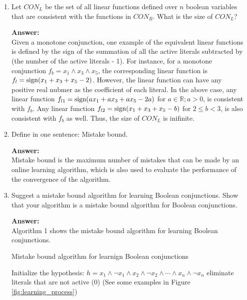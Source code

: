 \begin{enumerate}
{\bf Answer:}\\
For every variable, there are two cases, active or not active. Thus, the size of $CON_B$ is $2^n$. 

\item Let $CON_L$ be the set of all linear functions defined over $n$ boolean variables that are consistent with the functions in $CON_B$. What is the size of $CON_L$?

{\bf Answer:}\\
Given a monotone conjunction, one example of the equivalent linear functions is defined by the sign of the summation of all the active literals subtracted by (the number of the active literals - 1). For instance, for a monotone conjunction $f_b = x_1 \wedge x_3 \wedge x_5$, the corresponding linear function is $f_l = {\rm sign}(x_1 + x_3 + x_5 - 2)$. However, the linear function can have any positive real nubmer as the coefficient of each literal. In the above case, any linear function $f_{l1} = {\rm sign}(a x_1 + a x_3 + a x_5 - 2a)$ for $a \in \mathbb{R}; a > 0$, is consistent with $f_b$. Any linear function $f_{l2} = {\rm sign}(x_1 + x_3 + x_5 - b)$ for $2 \le b < 3$, is also consistent with $f_b$ as well. Thus, the size of $CON_L$ is inifinite.

\item Define in one sentence: Mistake bound.

{\bf Answer:}\\
Mistake bound is the maximum number of mistakes that can be made by an online learning algorithm, which is also used to evaluate the performance of the convergence of the algorithm. 

\item Suggest a mistake bound algorithm for learning Boolean conjunctions. Show that your algorithm is a mistake bound algorithm for Boolean conjunctions.

{\bf Answer:}\\
Algorithm 1 shows the mistake bound algorithm for learning Boolean conjunctions.

\begin{algorithm}
\caption{Mistake bound algorithm for learnign Boolean conjunctions}\label{euclid}
\begin{algorithmic}[1]
\State Initialize the hypothesis: $h =  x_1 \wedge \neg x_1 \wedge x_2 \wedge \neg x_2 \wedge \cdots \wedge x_n \wedge \neg x_n$
\State eliminate literals that are not active (0) \hspace*{\fill} (See some examples in Figure \ref{fig:learning_process})
\EndIf
\EndFor
\EndProcedure
\end{algorithmic}
\end{algorithm}




\end{enumerate}
